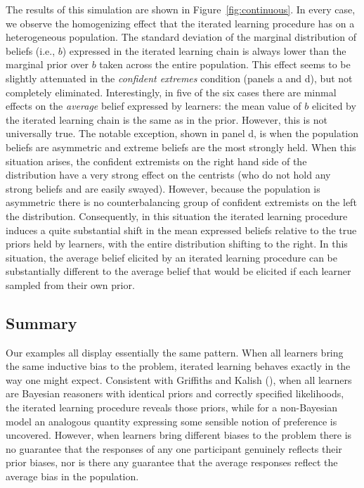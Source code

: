 \documentclass[doc]{apa6}
\begin{document}
The results of this simulation are shown in Figure~\ref{fig:continuous}. In every case, we observe the homogenizing effect that the iterated learning procedure has on a heterogeneous population. The standard deviation of the marginal distribution of beliefs (i.e., $b$) expressed in the iterated learning chain is always lower than the marginal prior over $b$ taken across the entire population. This effect seems to be slightly attenuated in the {\it confident extremes} condition (panels a and d), but not completely eliminated. Interestingly, in five of the six cases there are minmal effects on the {\it average} belief expressed by learners: the mean value of $b$ elicited by the iterated learning chain is the same as in the prior. However, this is not universally true. The notable exception, shown in panel d, is when the population beliefs are asymmetric and extreme beliefs are the most strongly held. When this situation arises, the confident extremists on the right hand side of the distribution have a very strong effect on the centrists (who do not hold any strong beliefs and are easily swayed). However, because the population is asymmetric there is no counterbalancing group of confident extremists on the left the distribution. Consequently, in this situation the iterated learning procedure induces a quite substantial shift in the mean expressed beliefs relative to the true priors held by learners, with the entire distribution shifting to the right. In this situation, the average belief elicited by an iterated learning procedure can be substantially different to the average belief that would be elicited if each learner sampled from their own prior.


\subsection{Summary}

Our examples all display essentially the same pattern. When all learners bring the same inductive bias to the problem, iterated learning behaves exactly in the way one might expect. Consistent with Griffiths and Kalish (\citeyear{griffiths_language_2007}), when all learners are Bayesian reasoners with identical priors and correctly specified likelihoods, the iterated learning procedure reveals those priors, while for a non-Bayesian model an analogous quantity expressing some sensible notion of preference is uncovered. However, when learners bring different biases to the problem there is no guarantee that the responses of any one participant genuinely reflects their prior biases, nor is there any guarantee that the average responses reflect the average bias in the population.
\end{document}
